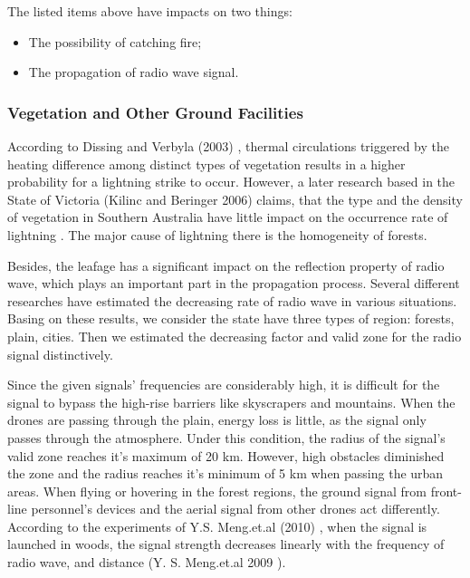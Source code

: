 \documentclass[13pt]{ctexart} %
\begin{document}
The listed items above have impacts on two things:
\begin{itemize}
    \item The possibility of catching fire;
    \item The propagation of radio wave signal.
\end{itemize}

\subsubsection{Vegetation and Other Ground Facilities}\label{BRM-model-vegetation}
According to Dissing and Verbyla (2003) \cite{Dorte-lightning01}, thermal circulations triggered by the heating difference among distinct types of vegetation results in a higher probability for a lightning strike to occur. However, a later research based in the State of Victoria (Kilinc and Beringer 2006) claims, that the type and the  density of vegetation in Southern Australia have little impact on the occurrence rate of lightning \cite{Musa-lightning02}. The major cause of lightning there is the homogeneity of forests.

Besides, the leafage has a significant impact on the reflection property of radio wave, which plays an important part in the propagation process.
Several different researches have estimated the decreasing rate of radio wave in various situations. Basing on these results, we consider the state have three types of region: forests, plain, cities. Then we estimated the decreasing factor and valid zone for the radio signal distinctively.

Since the given signals' frequencies are considerably high, it is difficult for the signal to bypass the high-rise barriers like skyscrapers and mountains.
When the drones are passing through the plain, energy loss is little, as the signal only passes through the atmosphere. Under this condition, the radius of the signal's valid zone reaches it's maximum of 20 km. However, high obstacles diminished the zone and the radius reaches it's minimum of 5 km when passing the urban areas. When flying or hovering in the forest regions, the ground signal from front-line personnel's devices and the aerial signal from other drones act differently. According to the experiments of Y.S. Meng.et.al (2010) \cite{Ng-vhf-radio}, when the signal is launched in woods, the signal strength decreases linearly with the frequency of radio wave, and distance (Y. S. Meng.et.al 2009 \cite{Ng-vhfuhf-ieee}).
\end{document}
